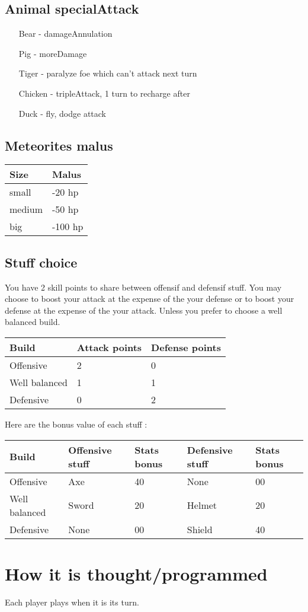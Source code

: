 \subsection{Animal specialAttack}

\begin{itemize}
 \item[Bear] - damageAnnulation
 \item[Pig] - moreDamage
 \item[Tiger] - paralyze foe which can't attack next turn
 \item[Chicken] - tripleAttack, 1 turn to recharge after
 \item[Duck] - fly, dodge attack
\end{itemize}


\subsection{Meteorites malus}

\begin{tabular}{|R{3cm}|C{3cm}|}
\hline {} Size & Malus \\
\hline small & -20 hp\\
\hline medium & -50 hp \\
\hline big & -100 hp \\
\hline 
\end{tabular}


\subsection{Stuff choice}
You have 2 skill points to share between offensif and defensif stuff. 
You may choose to boost your attack at the expense of the your defense or to boost your defense at the expense of the your attack. 
Unless you prefer to choose a well balanced build.

\begin{tabular}{|R{3,5cm}|C{3cm}|C{3cm}|}
\hline {} Build & Attack points & Defense points  \\
\hline Offensive & 2 & 0 \\
\hline Well balanced & 1 & 1 \\
\hline Defensive & 0 & 2 \\
\hline 
\end{tabular}

Here are the bonus value of each stuff :

\begin{tabular}{|R{3,5cm}|C{3cm}|C{2cm}|C{3cm}|C{2cm}|}
\hline {} Build & Offensive stuff & Stats bonus & Defensive stuff & Stats bonus \\
\hline Offensive & Axe & 40 & None & 00 \\
\hline Well balanced & Sword & 20 & Helmet & 20 \\
\hline Defensive & None & 00 & Shield & 40 \\
\hline 
\end{tabular}

\section{How it is thought/programmed}

Each player plays when it is its turn.



